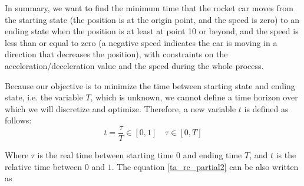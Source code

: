 \documentclass  [
  paper    = a4,
  BCOR     = 10mm,
  twoside,
  fontsize = 12pt,
  fleqn,
  toc      = bibnumbered,
  toc      = listofnumbered,
  numbers  = noendperiod,
  headings = normal,
  listof   = leveldown,
  version  = 3.03
]                                       {scrreprt}
\newcommand{\<}{\langle}
\renewcommand{\>}{\rangle}
\begin{document}
   In summary, we want to find the minimum time that the rocket car moves from the starting state (the position is at the origin point, and the speed is zero) to an ending state when the position is at least at point 10 or beyond, and the speed is less than or equal to zero (a negative speed indicates the car is moving in a direction that decreases the position), with constraints on the acceleration/deceleration value and the speed during the whole process. 
   
   Because our objective is to minimize the time between starting state and ending state, i.e. the variable $T$, which is unknown, we cannot define a time horizon over which we will discretize and optimize. Therefore, a new variable $t$ is defined as follows: 
   \begin{equation*}
   t= \frac{\tau}{T} \in [0,1] \quad \tau \in [0, T]
   \label{eqn:timet}
   \end{equation*}
   
   Where $\tau$ is the real time between starting time $0$ and ending time $T$, and $t$ is the relative time between $0$ and $1$.  The equation \ref{ta_rc_partial2} can be also written as 
   
\end{document}
